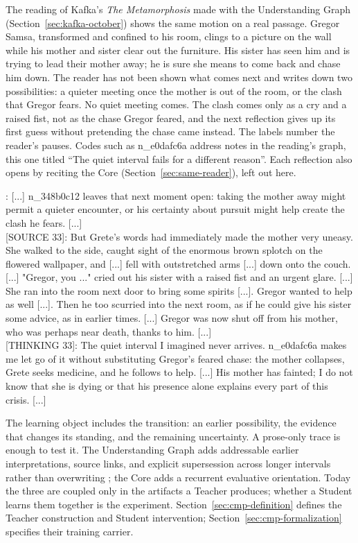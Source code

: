 \documentclass[11pt]{article}
\begin{document}
The reading of Kafka's \emph{The Metamorphosis} made with the Understanding Graph
(Section~\ref{sec:kafka-october}) shows the same motion on a real passage.
Gregor Samsa, transformed and confined to his room, clings to a picture on the
wall while his mother and sister clear out the furniture. His sister has seen
him and is trying to lead their mother away; he is sure she means to come back
and chase him down. The reader has not been shown what comes next and writes
down two possibilities: a quieter meeting once the mother is out of the room,
or the clash that Gregor fears. No quiet meeting comes. The clash comes only as a cry and
a raised fist, not as the chase Gregor feared, and the next reflection gives up
its first guess without pretending the chase came instead. The labels number the
reader's pauses. Codes such as n\_e0dafc6a address notes in the reading's graph,
this one titled \enquote{The quiet interval fails for a different reason}. Each
reflection also opens by reciting the Core (Section~\ref{sec:same-reader}), left
out here.

\begin{compactmetabox}
[THINKING 32]: [...] n\_348b0c12 leaves that next moment open: taking the mother away might permit a quieter encounter, or his certainty about pursuit might help create the clash he fears. [...]\\[0.35em]
[SOURCE 33]: But Grete's words had immediately made the mother very uneasy. She walked to the side, caught sight of the enormous brown splotch on the flowered wallpaper, and [...] fell with outstretched arms [...] down onto the couch. [...] "Gregor, you ..." cried out his sister with a raised fist and an urgent glare. [...] She ran into the room next door to bring some spirits [...]. Gregor wanted to help as well [...]. Then he too scurried into the next room, as if he could give his sister some advice, as in earlier times. [...] Gregor was now shut off from his mother, who was perhaps near death, thanks to him. [...]\\[0.35em]
[THINKING 33]: The quiet interval I imagined never arrives. n\_e0dafc6a makes me let go of it without substituting Gregor's feared chase: the mother collapses, Grete seeks medicine, and he follows to help. [...] His mother has fainted; I do not know that she is dying or that his presence alone explains every part of this crisis. [...]
\end{compactmetabox}

The learning object includes the transition: an earlier possibility, the
evidence that changes its standing, and the remaining uncertainty. A prose-only
trace is enough to test it. The Understanding Graph adds addressable earlier
interpretations, source links, and explicit supersession across longer
intervals rather than overwriting \cite{westerberg2026understanding}; the Core
adds a recurrent evaluative orientation. Today the three are coupled only in
the artifacts a Teacher produces; whether a Student learns them together is the
experiment. Section~\ref{sec:cmp-definition} defines the Teacher construction
and Student intervention; Section~\ref{sec:cmp-formalization} specifies their
training carrier.
\end{document}
